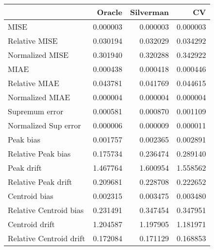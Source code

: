\begin{tabular}{lrrr}
  \toprule
 & Oracle & Silverman & CV \\ 
  \midrule
MISE & 0.000003 & 0.000003 & 0.000003 \\ 
  Relative MISE & 0.030194 & 0.032029 & 0.034292 \\ 
  Normalized MISE & 0.301940 & 0.320288 & 0.342922 \\ 
  MIAE & 0.000438 & 0.000418 & 0.000446 \\ 
  Relative MIAE & 0.043781 & 0.041769 & 0.044615 \\ 
  Normalized MIAE & 0.000004 & 0.000004 & 0.000004 \\ 
  Supremum error & 0.000581 & 0.000870 & 0.001109 \\ 
  Normalized Sup error & 0.000006 & 0.000009 & 0.000011 \\ 
  Peak bias & 0.001757 & 0.002365 & 0.002891 \\ 
  Relative Peak bias & 0.175734 & 0.236474 & 0.289140 \\ 
  Peak drift & 1.467764 & 1.600954 & 1.558562 \\ 
  Relative Peak drift & 0.209681 & 0.228708 & 0.222652 \\ 
  Centroid bias & 0.002315 & 0.003475 & 0.003480 \\ 
  Relative Centroid bias & 0.231491 & 0.347454 & 0.347951 \\ 
  Centroid drift & 1.204587 & 1.197905 & 1.181971 \\ 
  Relative Centroid drift & 0.172084 & 0.171129 & 0.168853 \\ 
   \bottomrule
\end{tabular}

